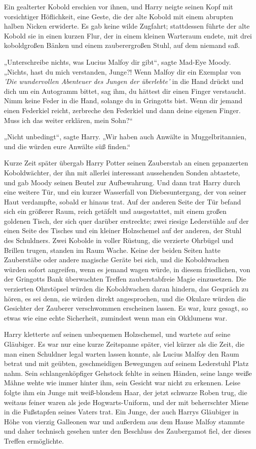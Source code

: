 {Ein gealterter Kobold erschien vor ihnen, und Harry neigte seinen Kopf mit vorsichtiger Höflichkeit, eine Geste, die der alte Kobold mit einem abrupten halben Nicken erwiderte. Es gab keine wilde Zugfahrt; stattdessen führte der alte Kobold sie in einen kurzen Flur, der in einem kleinen Warteraum endete, mit drei koboldgroßen Bänken und einem zauberergroßen Stuhl, auf dem niemand saß.

„Unterschreibe nichts, was Lucius Malfoy dir gibt“, sagte Mad-Eye Moody. „Nichts, hast du mich verstanden, Junge?! Wenn Malfoy dir ein Exemplar von \emph{'Die wundervollen Abenteuer des Jungen der überlebte'} in die Hand drückt und dich um ein Autogramm bittet, sag ihm, du hättest dir einen Finger verstaucht. Nimm keine Feder in die Hand, solange du in Gringotts bist. Wenn dir jemand einen Federkiel reicht, zerbreche den Federkiel und dann deine eigenen Finger. Muss ich das weiter erklären, mein Sohn?“

„Nicht unbedingt“, sagte Harry. „Wir haben auch Anwälte in Muggelbritannien, und die würden eure Anwälte süß finden.“

Kurze Zeit später übergab Harry Potter seinen Zauberstab an einen gepanzerten Koboldwächter, der ihn mit allerlei interessant aussehenden Sonden abtastete, und gab Moody seinen Beutel zur Aufbewahrung. Und dann trat Harry durch eine weitere Tür, und ein kurzer Wasserfall von Diebesuntergang, der von seiner Haut verdampfte, sobald er hinaus trat. Auf der anderen Seite der Tür befand sich ein größerer Raum, reich getäfelt und ausgestattet, mit einem großen goldenen Tisch, der sich quer darüber erstreckte; zwei riesige Lederstühle auf der einen Seite des Tisches und ein kleiner Holzschemel auf der anderen, der Stuhl des Schuldners. Zwei Kobolde in voller Rüstung, die verzierte Ohrbügel und Brillen trugen, standen im Raum Wache. Keine der beiden Seiten hatte Zauberstäbe oder andere magische Geräte bei sich, und die Koboldwachen würden sofort angreifen, wenn es jemand wagen würde, in diesem friedlichen, von der Gringotts Bank überwachten Treffen zauberstabfreie Magie einzusetzen. Die verzierten Ohrstöpsel würden die Koboldwachen daran hindern, das Gespräch zu hören, es sei denn, sie würden direkt angesprochen, und die Okulare würden die Gesichter der Zauberer verschwommen erscheinen lassen. Es war, kurz gesagt, so etwas wie eine echte Sicherheit, zumindest wenn man ein Okklumens war.

Harry kletterte auf seinen unbequemen Holzschemel, und wartete auf seine Gläubiger. Es war nur eine kurze Zeitspanne später, viel kürzer als die Zeit, die man einen Schuldner legal warten lassen konnte, als Lucius Malfoy den Raum betrat und mit geübten, geschmeidigen Bewegungen auf seinem Lederstuhl Platz nahm. Sein schlangenköpfiger Gehstock fehlte in seinen Händen, seine lange weiße Mähne wehte wie immer hinter ihm, sein Gesicht war nicht zu erkennen. Leise folgte ihm ein Junge mit weiß-blondem Haar, der jetzt schwarze Roben trug, die weitaus feiner waren als jede Hogwarts-Uniform, und der mit beherrschter Miene in die Fußstapfen seines Vaters trat. Ein Junge, der auch Harrys Gläubiger in Höhe von vierzig Galleonen war und außerdem aus dem Hause Malfoy stammte und daher technisch gesehen unter den Beschluss des Zaubergamot fiel, der dieses Treffen ermöglichte.

}
